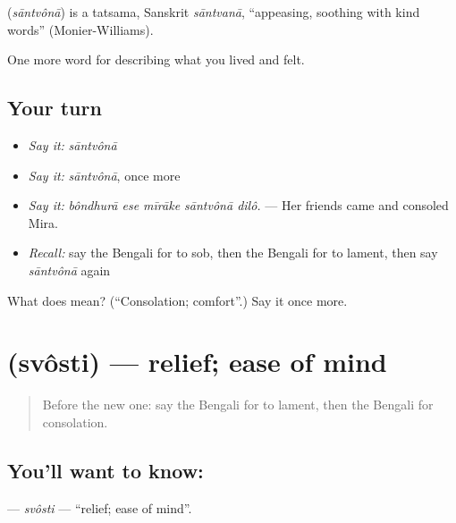 \begin{cousinweb}
\textbf{} (\emph{sāntvônā}) is a tatsama, Sanskrit \emph{sāntvanā}, \textquotedblleft{}appeasing, soothing with kind words\textquotedblright{} (Monier-Williams).
\end{cousinweb}

\begin{grammarlens}[title={What you've built}]
One more word for describing what you lived and felt.
\end{grammarlens}

\subsection*{Your turn}
\begin{itemize}
\raggedright
  \item \emph{Say it:} \emph{sāntvônā}
  \item \emph{Say it:} \emph{sāntvônā}, once more
  \item \emph{Say it:} \emph{bôndhurā ese mīrāke sāntvônā dilô.} — Her friends came and consoled Mira.
  \item \emph{Recall:} say the Bengali for to sob, then the Bengali for to lament, then say \emph{sāntvônā} again
\end{itemize}

\begin{tcolorbox}[breakable,colback=teal!4,colframe=teal!35!black,title={Before you move on}]
What does  mean? (\textquotedblleft{}Consolation; comfort\textquotedblright{}.) Say it once more.
\end{tcolorbox}
\section[\texorpdfstring{\bn{স্বস্তি} (svôsti)}{স্বস্তি (svôsti)}]{ (svôsti) — relief; ease of mind}

\label{lesson:BN-C446-svosti}



\begin{quote}
Before the new one: say the Bengali for to lament, then the Bengali for consolation.
\end{quote}

\subsection*{You'll want to know: }
\textbf{} — \emph{svôsti} — \textquotedblleft{}relief; ease of mind\textquotedblright{}.

